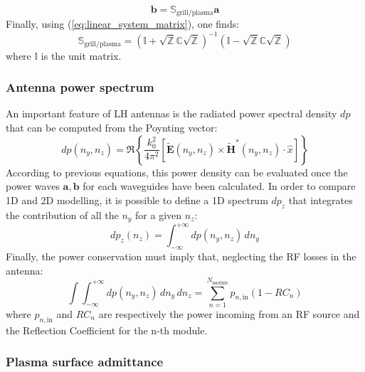 \begin{equation}
\mathbf{b}=\mathbb{S}_{\mbox{grill/plasma}}\mathbf{a}\label{eq:Sgrillplasma_def}
\end{equation}
Finally, using (\ref{eq:linear_system_matrix}), one finds:
\begin{equation}
\mathbb{S}_{\mbox{grill/plasma}}=\left(\mathbb{I}+\sqrt{\mathbb{Z}}\mathbb{C}\sqrt{\mathbb{Z}}\right)^{-1}\left(\mathbb{I}-\sqrt{\mathbb{Z}}\mathbb{C}\sqrt{\mathbb{Z}}\right)
\end{equation}
where $\mathbb{I}$ is the unit matrix.

\subsubsection{Antenna power spectrum}
An important feature of LH antennas is the radiated power spectral density $dp$ that can be computed from the Poynting vector: \begin{equation} dp\left(n_{y},n_{z}\right)=\Re\left\{ \frac{k_{0}^{2}}{4\pi^{2}}\left[\tilde{\mathbf{E}}\left(n_{y},n_{z}\right)\times\mathbf{\tilde{H}^{*}}\left(n_{y},n_{z}\right)\cdot\widehat{x}\right]\right\} \label{eq:power_spectrum_2D}
\end{equation}
According to previous equations, this power density can be evaluated once the power waves $\mathbf{a},\mathbf{b}$ for each waveguides have been calculated. In order to compare 1D and 2D modelling, it is possible to define a 1D spectrum $dp_{z}$ that integrates the contribution of all the $n_{y}$ for a given $n_{z}$:
\begin{equation}
dp_{z}\left(n_{z}\right)=\int_{-\infty}^{+\infty}\! dp\left(n_{y},n_{z}\right)\, dn_{y}\label{eq:power_spectrum_1D}
\end{equation}
Finally, the power conservation must imply that, neglecting the RF
losses in the antenna:
\begin{equation}
\int\int_{-\infty}^{+\infty}\! dp\left(n_{y},n_{z}\right)\, dn_{y}\, dn_{z}=\sum_{n=1}^{N_{\mbox{module}}}p_{n,\mbox{in}}\left(1-RC_{n}\right)\label{eq:spectrum_power_conservation}
\end{equation}
where $p_{n,\mbox{in}}$ and $RC_{n}$ are respectively the power incoming from an RF source and the Reflection Coefficient for the n-th module. 


\subsubsection{Plasma surface admittance}\label{sec:surface_admittance}

